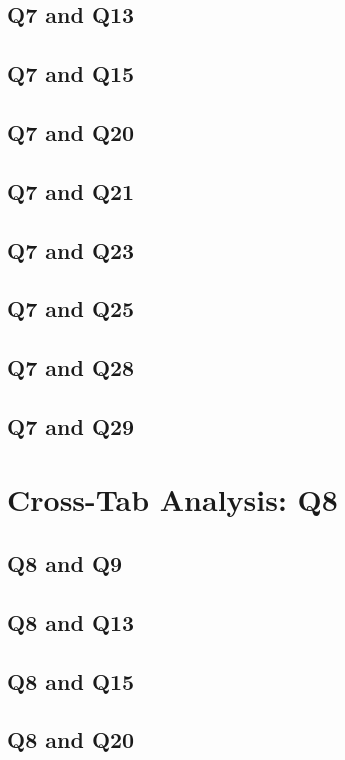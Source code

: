 \documentclass{report}
\begin{document}
\section{Q7 and Q13}\clearpage
\section{Q7 and Q15}\clearpage
\section{Q7 and Q20}\clearpage
\section{Q7 and Q21}\clearpage
\section{Q7 and Q23}\clearpage
\section{Q7 and Q25}\clearpage
\section{Q7 and Q28}\clearpage
\section{Q7 and Q29}\clearpage

\chapter{Cross-Tab Analysis: Q8}

\section{Q8 and Q9}\clearpage
\section{Q8 and Q13}\clearpage
\section{Q8 and Q15}\clearpage
\section{Q8 and Q20}\clearpage
\end{document}
